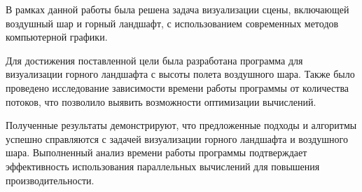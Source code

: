 
В рамках данной работы была решена задача визуализации сцены, включающей воздушный шар и горный ландшафт, с использованием современных методов компьютерной графики.

Для достижения поставленной цели была разработана программа для визуализации горного ландшафта с высоты полета воздушного шара. Также было проведено исследование зависимости времени работы программы от количества потоков, что позволило выявить возможности оптимизации вычислений.

Полученные результаты демонстрируют, что предложенные подходы и алгоритмы успешно справляются с задачей визуализации горного ландшафта и воздушного шара. Выполненный анализ времени работы программы подтверждает эффективность использования параллельных вычислений для повышения производительности.

\renewcommand\bibname{СПИСОК ИСПОЛЬЗОВАННЫХ ИСТОЧНИКОВ}



